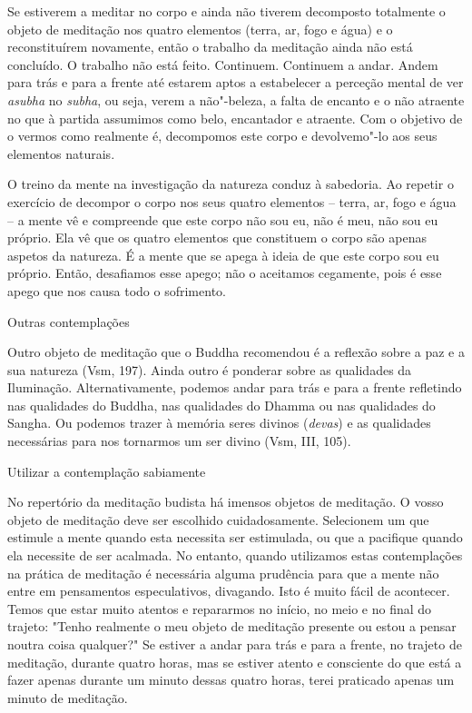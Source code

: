 Se estiverem a meditar no corpo e ainda não tiverem decomposto
totalmente o objeto de meditação nos quatro elementos (terra, ar, fogo e
água) e o reconstituírem novamente, então o trabalho da meditação ainda
não está concluído. O trabalho não está feito. Continuem. Continuem a
andar. Andem para trás e para a frente até estarem aptos a estabelecer a
perceção mental de ver \emph{asubha} no \emph{subha}, ou seja, verem a
não"-beleza, a falta de encanto e o não atraente no que à partida
assumimos como belo, encantador e atraente. Com o objetivo de o vermos
como realmente é, decompomos este corpo e devolvemo"-lo aos seus
elementos naturais.

O treino da mente na investigação da natureza conduz à sabedoria. Ao
repetir o exercício de decompor o corpo nos seus quatro elementos --
terra, ar, fogo e água -- a mente vê e compreende que este corpo não sou
eu, não é meu, não sou eu próprio. Ela vê que os quatro elementos que
constituem o corpo são apenas aspetos da natureza. É a mente que se
apega à ideia de que este corpo sou eu próprio. Então, desafiamos esse
apego; não o aceitamos cegamente, pois é esse apego que nos causa todo o
sofrimento.

\begin{siderule-quote}
  Outras contemplações
\end{siderule-quote}

Outro objeto de meditação que o Buddha recomendou é a reflexão
sobre a paz e a sua natureza (Vsm, 197). Ainda outro é ponderar sobre as
qualidades da Iluminação. Alternativamente, podemos andar para trás e
para a frente refletindo nas qualidades do Buddha, nas qualidades
do Dhamma ou nas qualidades do Sangha. Ou podemos trazer à
memória seres divinos (\emph{devas}) e as qualidades necessárias para
nos tornarmos um ser divino (Vsm, III, 105).

\begin{siderule-quote}
  Utilizar a contemplação sabiamente
\end{siderule-quote}

No repertório da meditação budista há imensos objetos de meditação. O
vosso objeto de meditação deve ser escolhido cuidadosamente. Selecionem
um que estimule a mente quando esta necessita ser estimulada, ou que a
pacifique quando ela necessite de ser acalmada. No entanto, quando
utilizamos estas contemplações na prática de meditação é necessária
alguma prudência para que a mente não entre em pensamentos
especulativos, divagando. Isto é muito fácil de acontecer. Temos que
estar muito atentos e repararmos no início, no meio e no final do
trajeto: "Tenho realmente o meu objeto de meditação presente ou estou a
pensar noutra coisa qualquer?" Se estiver a andar para trás e para a
frente, no trajeto de meditação, durante quatro horas, mas se estiver
atento e consciente do que está a fazer apenas durante um minuto dessas
quatro horas, terei praticado apenas um minuto de meditação.

